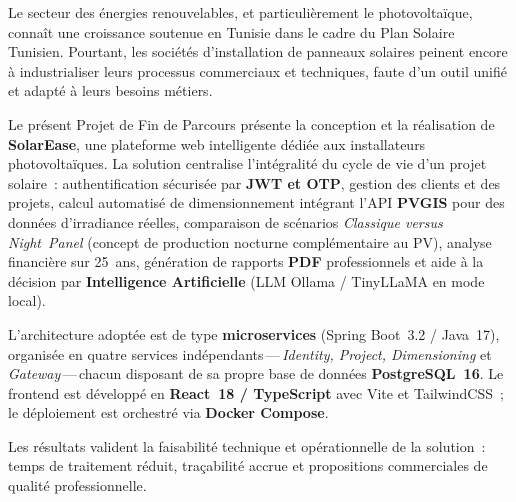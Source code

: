 \thispagestyle{fancy}

\vspace{6pt}

\begin{tcolorbox}[
  enhanced, breakable,
  colback=sectionbg, colframe=isetblue,
  arc=5pt, boxrule=0.8pt,
  attach boxed title to top left={yshift=-2mm, xshift=8mm},
  boxed title style={
    colback=isetblue, colframe=isetblue,
    arc=3pt, boxrule=0pt,
    fontupper=\bfseries\color{white}
  },
  title={Résumé},
  left=10pt, right=10pt, top=10pt, bottom=10pt
]
\setlength{\parskip}{4pt}
Le secteur des énergies renouvelables, et particulièrement le photovoltaïque,
connaît une croissance soutenue en Tunisie dans le cadre du Plan Solaire
Tunisien. Pourtant, les sociétés d'installation de panneaux solaires peinent
encore à industrialiser leurs processus commerciaux et techniques, faute d'un
outil unifié et adapté à leurs besoins métiers.

Le présent Projet de Fin de Parcours présente la conception et la réalisation
de \textbf{SolarEase}, une plateforme web intelligente dédiée aux installateurs
photovoltaïques. La solution centralise l'intégralité du cycle de vie d'un
projet solaire~: authentification sécurisée par \textbf{JWT et OTP}, gestion
des clients et des projets, calcul automatisé de dimensionnement intégrant
l'API \textbf{PVGIS} pour des données d'irradiance réelles, comparaison de
scénarios \textit{Classique versus Night~Panel} (concept de production
nocturne complémentaire au PV),
analyse financière sur 25~ans, génération de rapports \textbf{PDF}
professionnels et aide à la décision par \textbf{Intelligence Artificielle}
(LLM Ollama / TinyLLaMA en mode local).

L'architecture adoptée est de type \textbf{microservices} (Spring Boot~3.2 /
Java~17), organisée en quatre services indépendants\,---\,\textit{Identity,
Project, Dimensioning} et \textit{Gateway}\,---\,chacun disposant de sa propre
base de données \textbf{PostgreSQL~16}. Le frontend est développé en
\textbf{React~18 / TypeScript} avec Vite et TailwindCSS~; le déploiement est
orchestré via \textbf{Docker Compose}.

Les résultats valident la faisabilité technique et opérationnelle de la solution~:
temps de traitement réduit, traçabilité accrue et propositions commerciales
de qualité professionnelle.
\end{tcolorbox}

